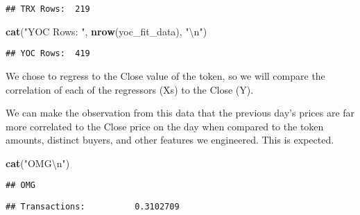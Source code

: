 \documentclass[]{article}
\newenvironment{Shaded}{\begin{snugshade}}{\end{snugshade}}
\newcommand{\KeywordTok}[1]{\textcolor[rgb]{0.13,0.29,0.53}{\textbf{#1}}}
\newcommand{\CharTok}[1]{\textcolor[rgb]{0.31,0.60,0.02}{#1}}
\newcommand{\StringTok}[1]{\textcolor[rgb]{0.31,0.60,0.02}{#1}}
\newcommand{\OperatorTok}[1]{\textcolor[rgb]{0.81,0.36,0.00}{\textbf{#1}}}
\newcommand{\NormalTok}[1]{#1}
\begin{document}
\begin{verbatim}
## TRX Rows:  219
\end{verbatim}

\begin{Shaded}
\begin{Highlighting}[]
\KeywordTok{cat}\NormalTok{(}\StringTok{"YOC Rows: "}\NormalTok{, }\KeywordTok{nrow}\NormalTok{(yoc_fit_data), }\StringTok{"}\CharTok{\textbackslash{}n}\StringTok{"}\NormalTok{)}
\end{Highlighting}
\end{Shaded}

\begin{verbatim}
## YOC Rows:  419
\end{verbatim}

We chose to regress to the Close value of the token, so we will compare
the correlation of each of the regressors (Xs) to the Close (Y).

We can make the observation from this data that the previous day's
prices are far more correlated to the Close price on the day when
compared to the token amounts, distinct buyers, and other features we
engineered. This is expected.

\begin{Shaded}
\begin{Highlighting}[]
\KeywordTok{cat}\NormalTok{(}\StringTok{"OMG}\CharTok{\textbackslash{}n}\StringTok{"}\NormalTok{)}
\end{Highlighting}
\end{Shaded}

\begin{verbatim}
## OMG
\end{verbatim}

\begin{Shaded}
\end{Shaded}

\begin{verbatim}
## Transactions:          0.3102709
\end{verbatim}

\begin{Shaded}
\end{Shaded}
\end{document}
